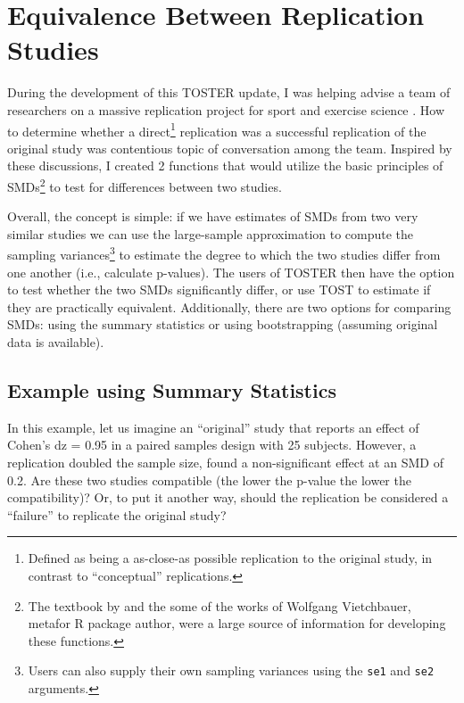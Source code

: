 \documentclass[]{interact}
\theoremstyle{plain}%
\theoremstyle{definition}
\theoremstyle{remark}
\begin{document}
\newpage

\hypertarget{equivalence-between-replication-studies}{%
\section{Equivalence Between Replication
Studies}\label{equivalence-between-replication-studies}}

During the development of this TOSTER update, I was helping advise a
team of researchers on a massive replication project for sport and
exercise science \citep{repSES}. How to determine whether a
direct\footnote{Defined as being a as-close-as possible replication to
  the original study, in contrast to ``conceptual'' replications.}
replication was a successful replication of the original study was
contentious topic of conversation among the team. Inspired by these
discussions, I created 2 functions that would utilize the basic
principles of SMDs\footnote{The textbook by \citet{borenstein} and the
  some of the works of Wolfgang Vietchbauer, metafor R package author,
  were a large source of information for developing these functions.} to
test for differences between two studies.

Overall, the concept is simple: if we have estimates of SMDs from two
very similar studies we can use the large-sample approximation to
compute the sampling variances\footnote{Users can also supply their own
  sampling variances using the \texttt{se1} and \texttt{se2} arguments.}
to estimate the degree to which the two studies differ from one another
(i.e., calculate p-values). The users of TOSTER then have the option to
test whether the two SMDs significantly differ, or use TOST to estimate
if they are practically equivalent. Additionally, there are two options
for comparing SMDs: using the summary statistics or using bootstrapping
(assuming original data is available).

\hypertarget{example-using-summary-statistics}{%
\subsection{Example using Summary
Statistics}\label{example-using-summary-statistics}}

In this example, let us imagine an ``original'' study that reports an
effect of Cohen's dz = 0.95 in a paired samples design with 25 subjects.
However, a replication doubled the sample size, found a non-significant
effect at an SMD of 0.2. Are these two studies compatible (the lower the
p-value the lower the compatibility)? Or, to put it another way, should
the replication be considered a ``failure'' to replicate the original
study?
\end{document}
